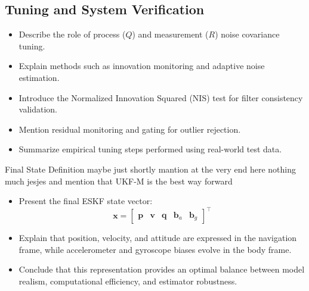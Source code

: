 \subsection{Tuning and System Verification}
\begin{itemize}
    \item Describe the role of process ($Q$) and measurement ($R$) noise covariance tuning.
    \item Explain methods such as innovation monitoring and adaptive noise estimation.
    \item Introduce the Normalized Innovation Squared (NIS) test for filter consistency validation.
    \item Mention residual monitoring and gating for outlier rejection.
    \item Summarize empirical tuning steps performed using real-world test data.
\end{itemize}

Final State Definition maybe just shortly mantion at the very end here nothing much jesjes and mention that UKF-M is the best way forward
\begin{itemize}
    \item Present the final ESKF state vector:
    $$
        \mathbf{x} =
        \begin{bmatrix}
            \mathbf{p} & \mathbf{v} & \mathbf{q} & \mathbf{b}_a & \mathbf{b}_g
        \end{bmatrix}^\top
    $$
    \item Explain that position, velocity, and attitude are expressed in the navigation frame, while accelerometer and gyroscope biases evolve in the body frame.
    \item Conclude that this representation provides an optimal balance between model realism, computational efficiency, and estimator robustness.
\end{itemize}